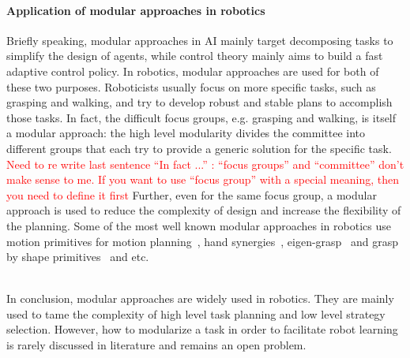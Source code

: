 \paragraph{Application of modular approaches in robotics}
Briefly speaking, modular approaches in AI mainly target decomposing tasks to simplify the design of agents, while control theory mainly aims to build a fast adaptive control policy. In robotics, modular approaches are used for both of these two purposes. Roboticists usually focus on more specific tasks, such as grasping and walking, and try to develop robust and stable plans to accomplish those tasks. In fact, the difficult focus groups, e.g. grasping and walking, is itself a modular approach: the high level modularity divides the committee into different groups that each try to provide a generic solution for the specific task.
\textcolor{red}{Need to re write last sentence ``In fact ...'' : ``focus groups'' and ``committee'' don't make sense to me. If you want to use ``focus group'' with a special meaning, then you need to define it first}
Further, even for the same focus group, a modular approach is used to reduce the complexity of design and increase the flexibility of the planning. Some of the most well known modular approaches in robotics use motion primitives for motion planning~\citep{ijspeert2002movement,inamura2004embodied,kulic2008incremental,peters2008reinforcement}, hand synergies~\citep{santello2000force,gabiccini2011role,gioioso2013mapping}, eigen-grasp~\citep{Ciocarlie2009} and grasp by shape primitives~\citep{miller2003automatic,huebner2008minimum} and etc.



~\\
In conclusion, modular approaches are widely used in robotics. They are mainly used to tame the complexity of high level task planning and low level strategy selection. However, how to modularize a task in order to facilitate robot learning is rarely discussed in literature and remains an open problem.






